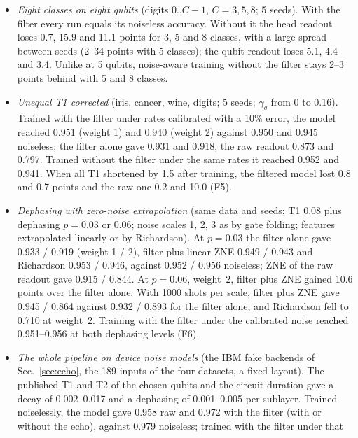 \documentclass[11pt]{article}
\begin{document}
\begin{itemize}
  Sec.~\ref{sec:echo}, 5 echo circuits per model). Here an in-sector error is a class confusion, and the echo
  corrects part of it: averaged over the backends the head readout gave 0.858 raw, 0.890 with the filter and 0.900
  with filter plus echo, against 0.91 noiseless.
\item \textit{Eight classes on eight qubits} (digits 0..$C-1$, $C=3,5,8$; 5 seeds). With the filter every run equals
  its noiseless accuracy. Without it the head readout loses 0.7, 15.9 and 11.1 points for 3, 5 and 8 classes, with a
  large spread between seeds (2--34 points with 5 classes); the qubit readout loses 5.1, 4.4 and 3.4. Unlike at 5
  qubits, noise-aware training without the filter stays 2--3 points behind with 5 and 8 classes.
\item \textit{Unequal T1 corrected} (iris, cancer, wine, digits; 5 seeds; $\gamma_q$ from 0 to 0.16). Trained with
  the filter under rates calibrated with a 10\% error, the model reached 0.951 (weight 1) and 0.940 (weight 2)
  against 0.950 and 0.945 noiseless; the filter alone gave 0.931 and 0.918, the raw readout 0.873 and 0.797. Trained
  without the filter under the same rates it reached 0.952 and 0.941. When all T1 shortened by 1.5 after training,
  the filtered model lost 0.8 and 0.7 points and the raw one 0.2 and 10.0 (F5).
\item \textit{Dephasing with zero-noise extrapolation} (same data and seeds; T1 0.08 plus dephasing $p=0.03$ or
  0.06; noise scales 1, 2, 3 as by gate folding; features extrapolated linearly or by Richardson). At $p=0.03$ the
  filter alone gave 0.933 / 0.919 (weight 1 / 2), filter plus linear ZNE 0.949 / 0.943 and Richardson 0.953 / 0.946,
  against 0.952 / 0.956 noiseless; ZNE of the raw readout gave 0.915 / 0.844. At $p=0.06$, weight~2, filter plus ZNE
  gained 10.6 points over the filter alone. With 1000 shots per scale, filter plus ZNE gave 0.945 / 0.864 against
  0.932 / 0.893 for the filter alone, and Richardson fell to 0.710 at weight~2. Training with the filter under the
  calibrated noise reached 0.951--0.956 at both dephasing levels (F6).
\item \textit{The whole pipeline on device noise models} (the IBM fake backends of Sec.~\ref{sec:echo}, the 189 inputs of
  the four datasets, a fixed layout). The published T1 and T2 of the chosen qubits and the circuit duration gave a decay
  of 0.002--0.017 and a dephasing of 0.001--0.005 per sublayer. Trained noiselessly, the model gave 0.958 raw and
  0.972 with the filter (with or without the echo), against 0.979 noiseless; trained with the filter under that

\end{itemize}
\end{document}
